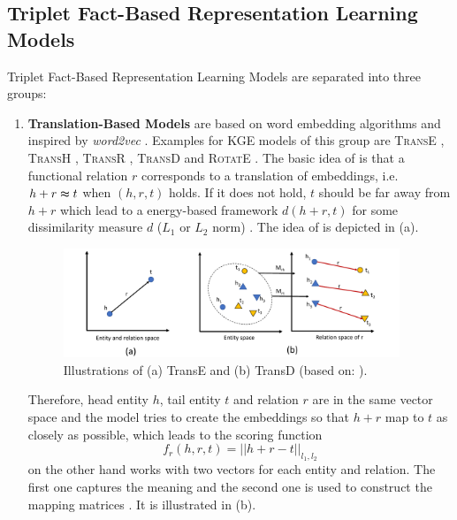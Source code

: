 \subsection{Triplet Fact-Based Representation Learning Models} 
\label{subsec:triplet_fact_based_representation_learning_models}


Triplet Fact-Based Representation Learning Models are separated into three groups:
\begin{enumerate}
    \item 
    \textbf{Translation-Based Models} are based on word embedding algorithms and inspired by \textit{word2vec} \cite{electronics9050750}.
    Examples for \ac{KGE} models of this group are \textsc{TransE} \cite{TransE}, \textsc{TransH} \cite{TransH}, \textsc{TransR} \cite{TransR}, \textsc{TransD} \cite{TransD}
    and 
    \textsc{RotatE} \cite{RotatE}.
    The basic idea of \transe is that a functional relation $r$ corresponds to a translation of embeddings, i.e. $h + r \thickapprox t$ when $(h,r,t)$ holds.
    If it does not hold, $t$ should be far away from $h + r$ which lead to a energy-based framework $d(h+r, t)$ for some dissimilarity measure $d$ ($L_1$ or $L_2$ norm) \cite{TransE}.
    The idea of \transe is depicted in  (a).
    \begin{figure}[t]
      \centering
        \includegraphics[width=0.95\textwidth]{figures/Transe+TransD.pdf}
      \caption{Illustrations of (a) TransE and (b) TransD (based on: \cite{electronics9050750}).}
      \label{fig:translationbasedmodels}
    \end{figure}
    Therefore, head entity $h$, tail entity $t$ and relation $r$ are in the same vector space and the model tries to create the embeddings so that $h+r$ map to $t$ as closely as possible, which leads to the scoring function
    \begin{equation}
        f_r(h,r,t) = || h + r - t ||_{l_1, l_2}
        \label{eq:transescoringfunction}
    \end{equation}
    \transd on the other hand works with two vectors for each entity and relation.
    The first one captures the meaning and the second one is used to construct the mapping matrices \cite{TransD}.
    It is illustrated in  (b).
    

\end{enumerate}

